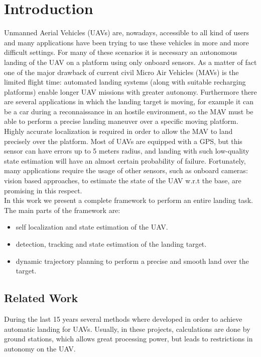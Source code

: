 \chapter{Introduction}\label{chap:introduction}
Unmanned Aerial Vehicles (UAVs) are, nowadays, accessible to all kind of users and many applications have been trying to use these vehicles in more and more difficult settings. For many of these scenarios it is necessary an autonomous landing of the UAV on a platform using only onboard sensors. As a matter of fact one of the major drawback of current civil Micro Air Vehicles (MAVs) is the limited flight time: automated landing systems (along with suitable recharging platforms) enable longer UAV missions with greater autonomy. Furthermore there are several applications in which the landing target is moving, for example it can be a car during a reconnaissance in an hostile environment, so the MAV must be able to perform a precise landing maneuver over a specific moving platform.\\

Highly accurate localization is required in order to allow the MAV to land precisely over the platform. Most of UAVs are equipped with a GPS, but this sensor can have errors up to 5 meters radius, and landing with such low-quality state estimation will have an almost certain probability of failure. Fortunately, many applications require the usage of other sensors, such as onboard cameras: vision based approaches, to estimate the state of the UAV w.r.t the base, are promising in this respect.\\

In this work we present a complete framework to perform an entire landing task. The main parts of the framework are:
\begin{itemize}
\item self localization and state estimation of the UAV.
\item detection, tracking and state estimation of the landing target.
\item dynamic trajectory planning to perform a precise and smooth land over the target.
\end{itemize}

\section{Related Work}\label{sec:related_work}

During the last 15 years several methods where developed in order to achieve automatic landing for UAVs.
Usually, in these projects, calculations are done by ground stations, which allows great processing power, but leads to restrictions in autonomy on the UAV. \\

